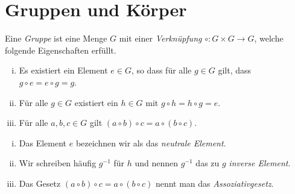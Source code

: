 \documentclass[../main.tex]{subfiles}
\begin{document}
\section{Gruppen und Körper}
\begin{definition}
  Eine \emph{Gruppe} ist eine Menge $G$
  mit einer \emph{Verknüpfung} $\circ \colon G \times G \to G$,
  welche folgende Eigenschaften erfüllt.
  \begin{enumerate}[(i)]
    \item Es existiert ein Element $e \in G$, so dass
      für alle $g \in G$ gilt, dass
      $g \circ e = e \circ g = g$.
    \item Für alle $g \in G$ existiert ein $h \in G$
      mit
      $g \circ h = h \circ g = e$.
    \item Für alle $a,b,c \in G$ gilt
      $(a \circ b) \circ c = a \circ (b \circ c)$.
  \end{enumerate}
\end{definition}

\begin{notation}
  \leavevmode
  \begin{enumerate}[(i)]
    \item Das Element $e$ bezeichnen wir als das \emph{neutrale Element}.
    \item Wir schreiben häufig $g^{-1}$ für $h$ und nennen $g^{-1}$
      das zu $g$ \emph{inverse Element}.
    \item Das Gesetz $(a \circ b) \circ c = a \circ (b \circ c)$ nennt man das \emph{Assoziativgesetz}.
  \end{enumerate}
\end{notation}
\end{document}
